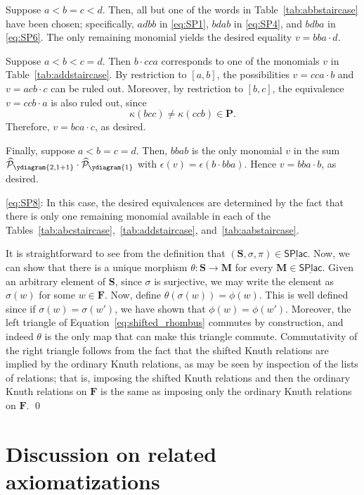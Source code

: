 \documentclass[12 pt]{amsart}
\newcommand{\Plactic}{{\mathbf{P}}}
\newcommand{\Free}{\mathbf{F}}
\newcommand{\sPlactic}{\mathbf{S}}
\newcommand{\Monoid}{\mathbf{M}}
\newcommand{\Category}{\underline{\mathsf{SPlac}}}
\newcommand{\sFreeSchur}{\widehat{\mathcal{P}}}
\theoremstyle{remark}
\numberwithin{equation}{section}
\begin{document}
    Suppose $a < b = c < d$.
    Then, all but one of the words in Table~\ref{tab:abbstaircase} have been chosen; specifically, $adbb$ in \eqref{eq:SP1}, $bdab$ in \eqref{eq:SP4}, and $bdba$ in \eqref{eq:SP6}.
 The only remaining monomial yields the desired equality $v= bba\cdot d.$

    Suppose $a < b < c = d$.
    Then $b\cdot cca$ corresponds to one of the monomials $v$ in Table~\ref{tab:addstaircase}. 
    By restriction to $[a,b]$, the possibilities $v = cca\cdot b$ and $v = acb\cdot c$ can be ruled out. Moreover, by restriction to $[b,c]$, the equivalence $v = ccb\cdot a$ is also ruled out, since
    \[
    \kappa(bcc) \neq \kappa(ccb) \in \Plactic.
    \] Therefore, $v = bca\cdot c$, as desired. 

    Finally, suppose $a < b=c=d$. Then, $bbab$ is the only monomial $v$ in the sum $\sFreeSchur_{\ydiagram{2,1+1}} \cdot \sFreeSchur_{\ydiagram{1}}$ with $\epsilon(v) = \epsilon(b\cdot bba)$. Hence $v=bba\cdot b$, as desired.

        \medbreak
   \eqref{eq:SP8}:
    In this case, the desired equivalences are determined by the fact that there is only one remaining monomial available in each of the Tables~\ref{tab:abcstaircase},~\ref{tab:addstaircase}, and~\ref{tab:aabstaircase}. 
   
\medskip 


It is straightforward to see from the definition that $(\sPlactic,\sigma,\pi) \in \Category$.
Now, we can show that there is a unique morphism $\theta : \sPlactic \to \Monoid$ for every $\Monoid \in \Category$. Given an arbitrary element of $\sPlactic$, since $\sigma$ is surjective, we may write the element as $\sigma(w)$ for some $w \in \Free$. Now, define $\theta(\sigma(w)) = \phi(w)$. This is well defined since if $\sigma(w) = \sigma(w')$, we have shown that $\phi(w) = \phi(w')$. Moreover, the left triangle of Equation~\eqref{eq:shifted_rhombus} commutes by construction, and indeed $\theta$ is the only map that can make this triangle commute. Commutativity of the right triangle follows from the fact that the shifted Knuth relations are implied by the ordinary Knuth relations, as may be seen by inspection of the lists of relations; that is, imposing the shifted Knuth relations and then the ordinary Knuth relations on $\Free$ is the same as imposing only the ordinary Knuth relations on $\Free$.
\qed





\section{Discussion on related axiomatizations}\label{sec:staircase}
\end{document}
